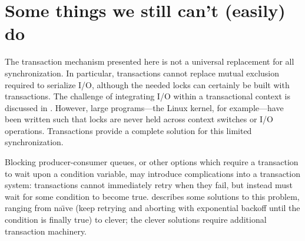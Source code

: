 \section{Some things we still can't (easily) do}\label{sec:xlimit}
The transaction mechanism presented here is not a universal
replacement for all synchronization.  In particular, transactions
cannot replace mutual exclusion
required to serialize I/O, although the needed locks can certainly be
built with transactions.  
The challenge of integrating I/O within a
transactional context is discussed in .
However, large programs---the
Linux kernel, for example---have been
written such that locks are
never held across context switches or I/O operations.  Transactions
provide a complete solution for this limited synchronization.

Blocking producer-consumer queues, or other options which require a
transaction to wait upon a condition variable, may introduce
complications into a transaction system: transactions cannot
immediately retry when they fail, but instead must wait for some
condition to become true.   describes some
solutions to this problem, ranging from na{\"\i}ve (keep retrying and
aborting with exponential backoff until the condition is finally true)
to clever; the clever solutions require additional transaction
machinery.



